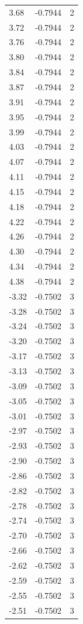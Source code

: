 \begin{longtable}{lrr}
  3.68 & -0.7944 & 2 \\
  3.72 & -0.7944 & 2 \\
  3.76 & -0.7944 & 2 \\
  3.80 & -0.7944 & 2 \\
  3.84 & -0.7944 & 2 \\
  3.87 & -0.7944 & 2 \\
  3.91 & -0.7944 & 2 \\
  3.95 & -0.7944 & 2 \\
  3.99 & -0.7944 & 2 \\
  4.03 & -0.7944 & 2 \\
  4.07 & -0.7944 & 2 \\
  4.11 & -0.7944 & 2 \\
  4.15 & -0.7944 & 2 \\
  4.18 & -0.7944 & 2 \\
  4.22 & -0.7944 & 2 \\
  4.26 & -0.7944 & 2 \\
  4.30 & -0.7944 & 2 \\
  4.34 & -0.7944 & 2 \\
  4.38 & -0.7944 & 2 \\
  -3.32 & -0.7502 & 3 \\
  -3.28 & -0.7502 & 3 \\
  -3.24 & -0.7502 & 3 \\
  -3.20 & -0.7502 & 3 \\
  -3.17 & -0.7502 & 3 \\
  -3.13 & -0.7502 & 3 \\
  -3.09 & -0.7502 & 3 \\
  -3.05 & -0.7502 & 3 \\
  -3.01 & -0.7502 & 3 \\
  -2.97 & -0.7502 & 3 \\
  -2.93 & -0.7502 & 3 \\
  -2.90 & -0.7502 & 3 \\
  -2.86 & -0.7502 & 3 \\
  -2.82 & -0.7502 & 3 \\
  -2.78 & -0.7502 & 3 \\
  -2.74 & -0.7502 & 3 \\
  -2.70 & -0.7502 & 3 \\
  -2.66 & -0.7502 & 3 \\
  -2.62 & -0.7502 & 3 \\
  -2.59 & -0.7502 & 3 \\
  -2.55 & -0.7502 & 3 \\
  -2.51 & -0.7502 & 3 \\

\end{longtable}

